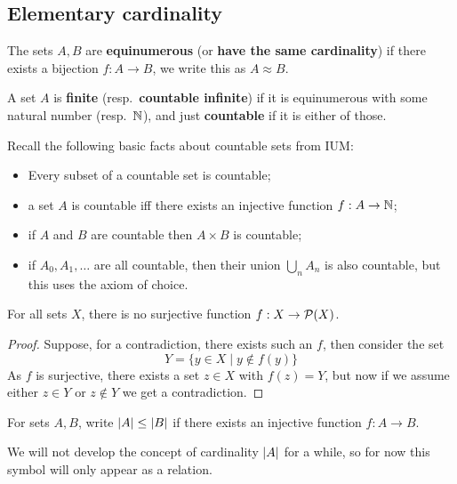 \documentclass{article}
\begin{document}
\subsection{Elementary cardinality}

\begin{definition}
    The sets $A,B$ are \textbf{equinumerous} (or \textbf{have the same cardinality}) if there exists a bijection $f:A\rightarrow B$, we write this as $A\approx B$.
\end{definition}

\begin{definition}
    A set $A$ is \textbf{finite} (resp.~\textbf{countable infinite}) if it is equinumerous with some natural number (resp.~$\mathbb{N}$), and just \textbf{countable} if it is either of those.
\end{definition}
Recall the following basic facts about countable sets from IUM:\begin{itemize}
    \item Every subset of a countable set is countable;
    \item a set $A$ is countable iff there exists an injective function $f:A\rightarrow \mathbb{N}$;
    \item if $A$ and $B$ are countable then $A\times B$ is countable;
    \item if $A_0,A_1,\ldots$ are all countable, then their union $\bigcup_n A_n$ is also countable, but this uses the axiom of choice.
\end{itemize}

\begin{theorem}[Cantor]
    For all sets $X$, there is no surjective function $f:X\rightarrow \mathcal{P}(X)$. \begin{proof}
        Suppose, for a contradiction, there exists such an $f$, then consider the set \[
        Y = \{y\in X \mid y\not\in f(y)\}
        \] As $f$ is surjective, there exists a set $z\in X$ with $f(z) = Y$, but now if we assume either $z\in Y$ or $z\not\in Y$ we get a contradiction.
    \end{proof}
\end{theorem}

\begin{definition}
    For sets $A,B$, write $\left| A \right|\leq \left| B \right|$ if there exists an injective function $f:A\rightarrow B$.
\end{definition}

We will not develop the concept of cardinality $\left| A \right|$ for a while, so for now this symbol will only appear as a relation.
\end{document}
